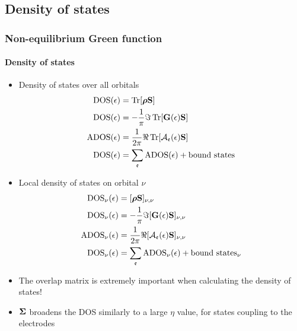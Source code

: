 \subsection{Density of states}

\begin{frame}[label=DOS]
  \frametitle{Non-equilibrium Green function}
  \framesubtitle{Density of states}
  
  \begin{itemize}
    \item Density of states over all orbitals
    \begin{align*}
      \mathrm{DOS}(\epsilon) &= \operatorname{Tr}[\boldsymbol{\rho} \mathbf{S}]
      \\
      \mathrm{DOS}(\epsilon) &= -\frac1\pi\Im\operatorname{Tr}[\mathbf{G}(\epsilon) \mathbf{S}]
      \\
      \mathrm{ADOS}(\epsilon) &= \frac1{2\pi}\Re\operatorname{Tr}[\mathcal{A}_{\mathfrak{e}}(\epsilon) \mathbf{S}]
      \\
      \mathrm{DOS}(\epsilon) &=\sum_{\mathfrak{e}} \mathrm{ADOS}(\epsilon) + \text{bound states}
    \end{align*}

    \vspace{-2ex}

    \item Local density of states on orbital $\nu$
    \begin{align*}
      \mathrm{DOS}_\nu(\epsilon) &= [\boldsymbol{\rho} \mathbf{S}]_{\nu,\nu}
      \\
      \mathrm{DOS}_\nu(\epsilon) &= -\frac1\pi\Im[\mathbf{G}(\epsilon) \mathbf{S}]_{\nu,\nu}
      \\
      \mathrm{ADOS}_\nu(\epsilon) &= \frac1{2\pi}\Re[\mathcal{A}_{\mathfrak{e}}(\epsilon) \mathbf{S}]_{\nu,\nu}
      \\
      \mathrm{DOS}_\nu(\epsilon) &=\sum_{\mathfrak{e}} \mathrm{ADOS}_\nu(\epsilon) + \text{bound states}_\nu
    \end{align*}

    \vspace{-2ex}

    \item<2->%
    The overlap matrix is extremely important when calculating the density of states!

    \item<3->%
    $\boldsymbol{\Sigma}$ broadens the DOS similarly to a large $\eta$ value, for states
    coupling to the electrodes
    
  \end{itemize}


\end{frame}


